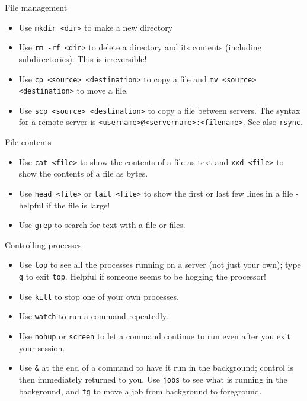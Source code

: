 \documentclass[dvipsnames]{beamer}
\newcommand{\command}[1]{\colorbox{light-gray}{\texttt{#1}}}
\newcommand{\filename}[1]{\colorbox{light-green}{\texttt{#1}}}
\begin{document}
\begin{frame}{File management}
  \begin{itemize}
  \item Use \command{mkdir <dir>} to make a new directory
  \item Use \command{rm -rf <dir>} to delete a directory and its contents (including subdirectories). This is irreversible!
  \item Use \command{cp <source> <destination>} to copy a file and \command{mv <source> <destination>} to move a file.
  \item Use \command{scp <source> <destination>} to copy a file between servers. The syntax for a remote server is \filename{<username>@<servername>:<filename>}. See also \command{rsync}.
  \end{itemize}
\end{frame}


\begin{frame}{File contents}
  \begin{itemize}
  \item Use \command{cat <file>} to show the contents of a file as text and \command{xxd <file>} to show the contents of a file as bytes.
  \item Use \command{head <file>} or \command{tail <file>} to show the first or last few lines in a file - helpful if the file is large!
  \item Use \command{grep} to search for text with a file or files.
  \end{itemize}
\end{frame}


\begin{frame}{Controlling processes}
  \begin{itemize}
  \item Use \command{top} to see all the processes running on a server (not just your own); type \command{q} to exit \command{top}. Helpful if someone seems to be hogging the processor!
  \item Use \command{kill} to stop one of your own processes.
  \item Use \command{watch} to run a command repeatedly.
  \item Use \command{nohup} or \command{screen} to let a command continue to run even after you exit your session.
  \item Use \command{\&} at the end of a command to have it run in the background; control is then immediately returned to you. Use \command{jobs} to see what is running in the background, and \command{fg} to move a job from background to foreground.
  \end{itemize}
\end{frame}
\end{document}
